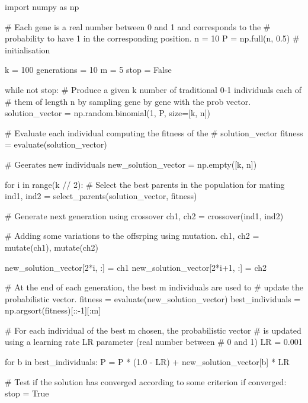 \documentclass[a4paper,12pt]{article} %
\begin{document}
	\begin{python}
import numpy as np

# Each gene is a real number between 0 and 1 and corresponds to the 
# probability to have 1 in the corresponding position.
n = 10
P = np.full(n, 0.5)  # initialisation

k = 100
generations = 10
m = 5
stop = False

while not stop:
	# Produce a given k number of traditional 0-1 individuals each of 
	# them of length n by sampling gene by gene with the prob vector.
	solution_vector = np.random.binomial(1, P, size=[k, n])
	
	# Evaluate each individual computing the fitness of the 
	# solution_vector
	fitness = evaluate(solution_vector)
	
	# Geerates new individuals
	new_solution_vector = np.empty([k, n])
	
	for i in range(k // 2):
		# Select the best parents in the population for mating
		ind1, ind2 = select_parents(solution_vector, fitness)
		
		# Generate next generation using crossover
		ch1, ch2 = crossover(ind1, ind2)
		
		# Adding some variations to the offsrping using mutation.
		ch1, ch2 = mutate(ch1), mutate(ch2)
		
		new_solution_vector[2*i, :] = ch1
		new_solution_vector[2*i+1, :] = ch2
	
	# At the end of each generation, the best m individuals are used to 
	# update the probabilistic vector.
	fitness = evaluate(new_solution_vector)
	best_individuals = np.argsort(fitness)[::-1][:m]
	
	# For each individual of the best m chosen, the probabilistic vector 
	# is updated using a learning rate LR parameter (real number between 
	# 0 and 1)
	LR = 0.001
	
	for b in best_individuals:
		P = P * (1.0 - LR) + new_solution_vector[b] * LR
	
	# Test if the solution has converged according to some criterion
	if converged:
		stop = True

\end{python}
	

	
	
	
\end{document}
